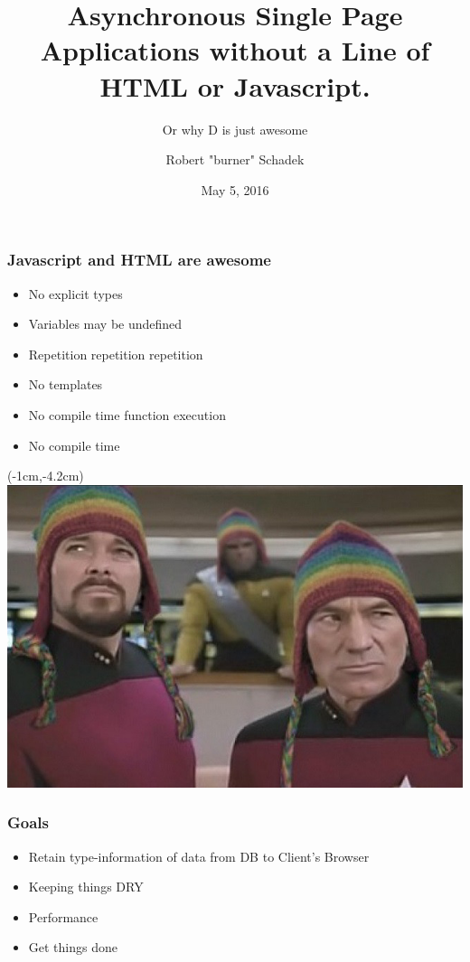 \documentclass[xelatex,13pt]{beamer}
\title{Asynchronous Single Page Applications without a Line of HTML or
Javascript.}
\subtitle{Or why D is just awesome}
\author{Robert "burner" Schadek}
\date{May 5, 2016}
\institute{DConf}
\begin{document}
\maketitle

\begin{frame}
	\frametitle{Javascript and HTML are \textbf{awesome}}
	\begin{itemize}
		\item No explicit types
		\item Variables may be undefined
		\item Repetition repetition repetition
		\item No templates
		\item No compile time function execution
			\pause
		\item No compile time
	\end{itemize}
\end{frame}


\begin{frame}[plain]
\begin{textblock*}{0cm}(-1cm,-4.2cm)
	\includegraphics[width=1.0\paperwidth]{picardriker.jpg}
\end{textblock*}
\end{frame}

\begin{frame}
	\frametitle{Goals}	
	\begin{itemize}
		\item Retain type-information of data from DB to Client's Browser
			\pause
		\item Keeping things DRY	
			\pause
		\item Performance
			\pause
		\item Get things done
	\end{itemize}
\end{frame}
\end{document}
